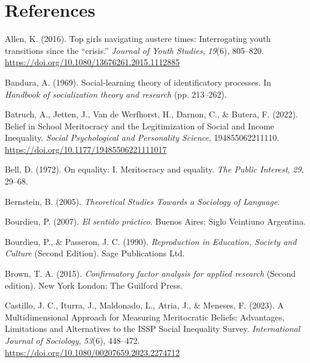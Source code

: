 \documentclass[
  13pt,
]{article}
\newlength{\cslhangindent}
\newenvironment{CSLReferences}[2] %
 {\begin{list}{}{%
  \setlength{\itemindent}{0pt}
  \setlength{\leftmargin}{0pt}
  \setlength{\parsep}{0pt}
  \ifodd #1
   \setlength{\leftmargin}{\cslhangindent}
   \setlength{\itemindent}{-1\cslhangindent}
  \fi
  \setlength{\itemsep}{#2\baselineskip}}}
 {\end{list}}
\begin{document}
\section{References}\label{references}

\label{refs}
\begin{CSLReferences}{1}{0}
Allen, K. (2016). Top girls navigating austere times: Interrogating
youth transitions since the {``crisis.''} \emph{Journal of Youth
Studies}, \emph{19}(6), 805--820.
\url{https://doi.org/10.1080/13676261.2015.1112885}

Bandura, A. (1969). Social-learning theory of identificatory processes.
In \emph{Handbook of socialization theory and research} (pp. 213--262).

Batruch, A., Jetten, J., Van de Werfhorst, H., Darnon, C., \& Butera, F.
(2022). Belief in {School Meritocracy} and the {Legitimization} of
{Social} and {Income Inequality}. \emph{Social Psychological and
Personality Science}, 194855062211110.
\url{https://doi.org/10.1177/19485506221111017}

Bell, D. (1972). On equality: {I}. {Meritocracy} and equality. \emph{The
Public Interest}, \emph{29}, 29--68.

Bernstein, B. (2005). \emph{Theoretical {Studies Towards} a {Sociology}
of {Language}}.

Bourdieu, P. (2007). \emph{{El sentido práctico}}. Buenos Aires: Siglo
Veintiuno Argentina.

Bourdieu, P., \& Passeron, J. C. (1990). \emph{Reproduction in
{Education}, {Society} and {Culture}} (Second Edition). Sage
Publications Ltd.

Brown, T. A. (2015). \emph{Confirmatory factor analysis for applied
research} (Second edition). New York London: The Guilford Press.

Castillo, J. C., Iturra, J., Maldonado, L., Atria, J., \& Meneses, F.
(2023). A {Multidimensional Approach} for {Measuring Meritocratic
Beliefs}: {Advantages}, {Limitations} and {Alternatives} to the {ISSP
Social Inequality Survey}. \emph{International Journal of Sociology},
\emph{53}(6), 448--472.
\url{https://doi.org/10.1080/00207659.2023.2274712}


\end{CSLReferences}
\end{document}
